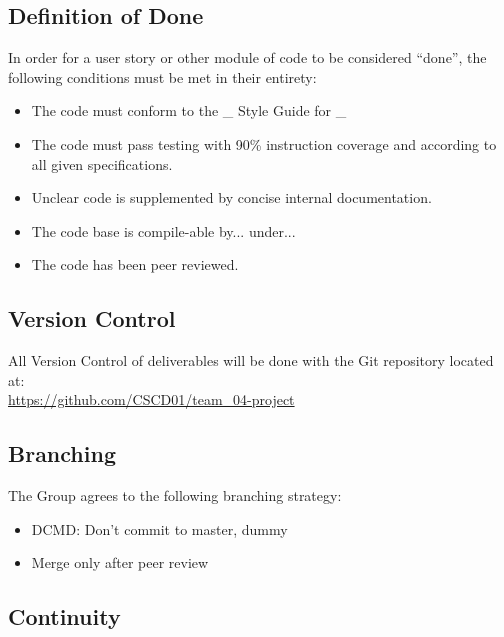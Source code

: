 \documentclass[a4paper,12pt]{article} %
\begin{document}
\subsection{Definition of Done}

In order for a user story or other module of code to be considered ``done'', the following conditions must be met in their entirety:
\begin{itemize}
\item The code must conform to the \_ Style Guide for \_
\item The code must pass testing with 90\% instruction coverage and according to all given specifications.
\item Unclear code is supplemented by concise internal documentation.
\item The code base is compile-able by... under...
\item The code has been peer reviewed.
\end{itemize}

\subsection{Version Control}

All Version Control of deliverables will be done with the Git repository located at: \\
\url{https://github.com/CSCD01/team_04-project}


\subsection{Branching}

The Group agrees to the following branching strategy:

\begin{itemize}
\item DCMD: Don't commit to master, dummy
\item Merge only after peer review
\end{itemize}

\subsection{Continuity}
\end{document}
